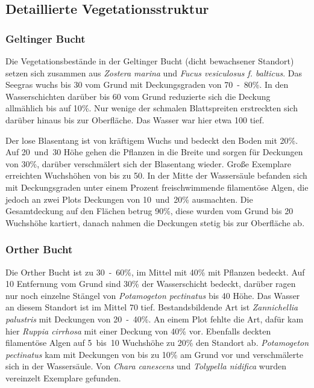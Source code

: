 
\subsection{Detaillierte Vegetationsstruktur}

\subsubsection{Geltinger Bucht}

Die Vegetationsbestände in der Geltinger Bucht (dicht bewachsener Standort) setzen sich zusammen aus \textit{Zostera marina} und \textit{Fucus vesiculosus f. balticus}. Das Seegras wuchs bis \unit{30}{\centi\metre} vom Grund mit Deckungsgraden von \unit{70-80}{\%}. In den Wasserschichten darüber bis \unit{60}{\centi\metre} vom Grund reduzierte sich die Deckung allmählich bis auf \unit{10}{\%}. Nur wenige der schmalen Blattspreiten erstreckten sich darüber hinaus bis zur Oberfläche. Das Wasser war hier etwa \unit{100}{\centi\metre} tief.

Der lose Blasentang ist von kräftigem Wuchs und bedeckt den Boden mit \unit{20}{\%}. Auf \unit{20 und 30}{\centi\metre} Höhe gehen die Pflanzen in die Breite und sorgen für Deckungen von \unit{30}{\%}, darüber verschmälert sich der Blasentang wieder. Große Exemplare erreichten Wuchshöhen von bis zu \unit{50}{\centi\metre}.
In der Mitte der Wassersäule befanden sich mit Deckungsgraden unter einem Prozent freischwimmende filamentöse Algen, die jedoch an zwei Plots Deckungen von \unit{10 und 20}{\%} ausmachten. Die Gesamtdeckung auf den Flächen betrug \unit{90}{\%}, diese wurden vom Grund bis \unit{20}{\centi\metre} Wuchshöhe kartiert, danach nahmen die Deckungen stetig bis zur Oberfläche ab.

\subsubsection{Orther Bucht}

Die Orther Bucht ist zu \unit{30-60}{\%}, im Mittel mit \unit{40}{\%} mit Pflanzen bedeckt. Auf \unit{10}{\centi\metre} Entfernung vom Grund sind \unit{30}{\%} der Wasserschicht bedeckt, darüber ragen nur noch einzelne Stängel von \textit{Potamogeton pectinatus} bis \unit{40}{\centi\metre} Höhe. Das Wasser an diesem Standort ist im Mittel \unit{70}{\cm} tief. Bestandsbildende Art ist \textit{Zannichellia palustris} mit Deckungen von \unit{20-40}{\%}. An einem Plot fehlte die Art, dafür kam hier \textit{Ruppia cirrhosa} mit einer Deckung von \unit{40}{\%} vor. Ebenfalls deckten filamentöse Algen auf \unit{5 bis 10}{\centi\metre} Wuchshöhe zu \unit{20}{\%} den Standort ab. \textit{Potamogeton pectinatus} kam mit Deckungen von bis zu \unit{10}{\%} am Grund vor und verschmälerte sich in der Wassersäule. Von \textit{Chara canescens} und \textit{Tolypella nidifica} wurden vereinzelt Exemplare gefunden.

